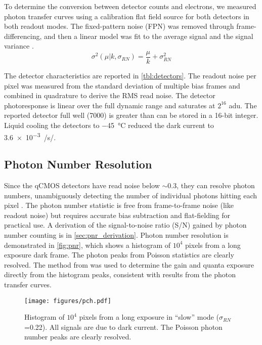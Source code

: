 To determine the conversion between detector counts and electrons, we measured photon transfer curves using a calibration flat field source for both detectors in both readout modes. The fixed-pattern noise (FPN) was removed through frame-differencing, and then a linear model was fit to the average signal and the signal variance \citep{janesick_photon_2007,stefanov_cmos_2022}. 
\begin{equation}
    \sigma^2\left(\mu | k, \sigma_{RN}\right) = \frac{\mu}{k} + \sigma^2_{RN}
\end{equation}

The detector characteristics are reported in \autoref{tbl:detectors}. The readout noise per pixel was measured from the standard deviation of multiple bias frames and combined in quadrature to derive the RMS read noise. The detector photoresponse is linear over the full dynamic range and saturates at $2^{16}$ \si{adu}. The reported detector full well (\SI{7000}{\electron}) is greater than can be stored in a 16-bit integer. Liquid cooling the detectors to \SI{-45}{\celsius} reduced the dark current to \SI{3.6e-3}{\electron/\second/\pixel}.

\subsection{Photon Number Resolution}

Since the qCMOS detectors have read noise below $\sim$\SI{0.3}{\electron}, they can resolve photon numbers, unambiguously detecting the number of individual photons hitting each pixel  \citep{starkey_determining_2016}. The photon number statistic is free from frame-to-frame noise (like readout noise) but requires accurate bias subtraction and flat-fielding for practical use. A derivation of the signal-to-noise ratio (S/N) gained by photon number counting is in \autoref{sec:pnr_derivation}. Photon number resolution is demonstrated in \autoref{fig:pnr}, which shows a histogram of $10^4$ pixels from a long exposure dark frame. The photon peaks from Poisson statistics are clearly resolved. The method from \citet{starkey_determining_2016} was used to determine the gain and quanta exposure directly from the histogram peaks, consistent with results from the photon transfer curves.

\begin{figure}
    \centering
    \texttt{[image: figures/pch.pdf]}
    \caption{Histogram of $10^4$ pixels from a long exposure in ``slow'' mode ($\sigma_{RN}$=\SI{0.22}{\electron}). All signals are due to dark current. The Poisson photon number peaks are clearly resolved.\label{fig:pch}}
\end{figure}

